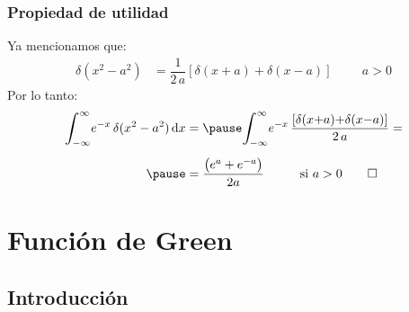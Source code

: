 \documentclass[12pt]{beamer}
\begin{document}
\begin{frame}
\frametitle{Propiedad de utilidad}
Ya mencionamos que:
\pause
\begin{align*}
\delta (x^{2} - a^{2}) &= \dfrac{1}{2 \, a} \left[ \delta (x + a) + \delta (x - a) \right] \hspace{1cm} a > 0
\end{align*}
\pause
Por lo tanto:
\pause
\begin{eqnarray*}
\begin{aligned}
\scaleint{6ex}_{\bs -\infty}^{\infty} e^{-x} \, \delta(x^{2} - a^{2}) \dd{x} &= \pause \scaleint{6ex}_{\bs -\infty}^{\infty} e^{-x} \, \dfrac{\left[ \delta (x {+} a) {+} \delta (x {-} a) \right]}{2 \, a} = \\[0.5em] \pause
&= \dfrac{\big( e^{a} + e^{-a} \big)}{2 a} \hspace{1cm} \text{si } a > 0 \qed
\end{aligned}
\end{eqnarray*}
\end{frame}





\section{Función de Green}
\subsection{Introducción}
\end{document}
